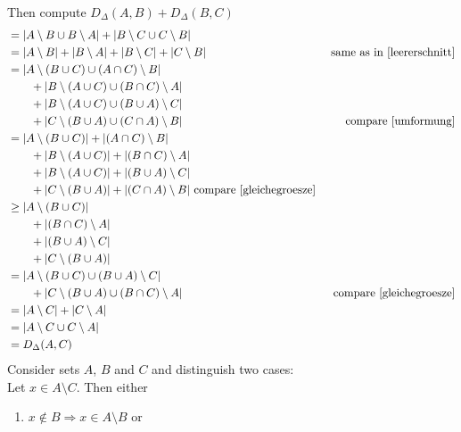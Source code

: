 \documentclass[10pt,a4paper,boxed]{hmcpset}
\begin{document}
\begin{solution}
\begin{enumerate}[(i)]
\begin{description}
							Then compute
							$D_\Delta(A,B) + D_\Delta(B,C)$ 
							\begin{align}
								&= |A \setminus B \cup B \setminus A| + |B \setminus C \cup C \setminus B| \\
								&= |A\setminus B| + | B \setminus A| + | B \setminus C| + |C \setminus B| & \text{ same as in \ref{leererschnitt}}\\
								&= | A \setminus (B \cup C) \cup (A \cap C) \setminus B| 					  \\
								&\qquad + | B \setminus ( A \cup C ) \cup (B \cap C) \setminus A | \\
								&\qquad + | B \setminus (A \cup C)  \cup (B \cup A) \setminus C |  \\
								&\qquad + | C \setminus(B \cup A) \cup (C \cap A) \setminus B|     &\text{ compare \ref{umformung}} \\
								&= | A \setminus (B \cup C)       | + | (A \cap C) \setminus B| 					  \\
								&\qquad + | B \setminus ( A \cup C ) | + | (B \cap C) \setminus A | \\
								&\qquad + | B \setminus (A \cup C)   | + | (B \cup A) \setminus C |  \\
								&\qquad + | C \setminus(B \cup A)    | + | (C \cap A) \setminus B| \text{ compare \ref{gleichegroesze}}\\
								&\geq | A \setminus (B \cup C)       | 					  \\
								&\qquad + | (B \cap C) \setminus A | \\
								&\qquad + | (B \cup A) \setminus C |  \\
								&\qquad + | C \setminus(B \cup A) | \\
								& = | A \setminus (B \cup C) \cup (B \cup A) \setminus C |  \\
								&\qquad + | C \setminus(B \cup A) \cup (B \cap C) \setminus A | & \text{ compare \ref{gleichegroesze}}\\
								& = | A \setminus C | + | C \setminus A| \\
								& = | A \setminus C \cup C \setminus A| \\
								& = D_\Delta(A,C)
							\end{align}
							Consider sets $A$, $B$ and $C$ and distinguish two cases:\\
							Let $x\in A \setminus C$. Then either
							\begin{enumerate}
								\item $x \notin B \Rightarrow x \in A \setminus B$ or

\end{enumerate}
\end{description}
\end{enumerate}
\end{solution}
\end{document}
